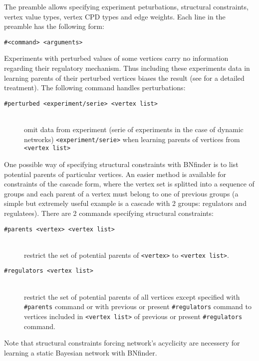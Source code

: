  The preamble allows specifying experiment peturbations, structural constraints, vertex value types, vertex CPD types and edge weights.
 Each line in the preamble has the following form:
\begin{verbatim}
#<command> <arguments>
\end{verbatim}

 Experiments with perturbed values of some vertices carry no information regarding their regulatory mechanism.
 Thus including these experiments data in learning parents of their perturbed vertices biases the result (see \cite{dojer06:BMC} for a detailed treatment).
 The following command handles perturbations:
\begin{description}
\item[\texttt{\#perturbed <experiment/serie> <vertex list>}]~\\
 omit data from experiment (serie of experiments in the case of dynamic networks) \texttt{<experiment/serie>} when learning parents of vertices from \texttt{<vertex list>} %
\end{description}

 One possible way of specifying structural constraints with BNfinder is to list potential parents of particular vertices.
 An easier method is available for constraints of the cascade form, where the vertex set is splitted into a sequence of groups and each parent of a vertex must belong to one of previous groups (a simple but extremely useful example is a cascade with 2 groups: regulators and regulatees).
 There are 2 commands specifying structural constraints:
\begin{description}
\item[\texttt{\#parents <vertex> <vertex list>}]~\\
 restrict the set of potential parents of \texttt{<vertex>} to \texttt{<vertex list>}.
\item[\texttt{\#regulators <vertex list>}]~\\
 restrict the set of potential parents of all vertices except specified with \texttt{\#parents} command or with previous or present \texttt{\#regulators} command to vertices included in \texttt{<vertex list>} of previous or present \texttt{\#regulators} command.
\end{description}
 Note that structural constraints forcing network's acyclicity are necessery for learning a static Bayesian network with BNfinder.
 
